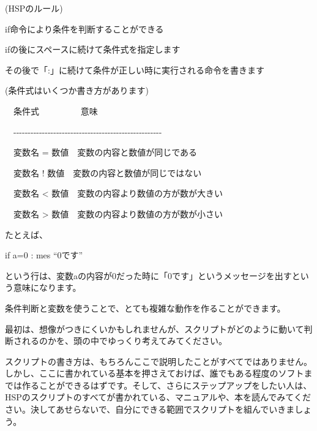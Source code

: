 \documentclass[text02.tex]{subfiles}
\begin{document}
\begin{description}
    \item (HSPのルール)
\end{description}

\begin{description}
    \item if命令により条件を判断することができる
    \item ifの後にスペースに続けて条件式を指定します
    \item その後で「:」に続けて条件が正しい時に実行される命令を書きます
\end{description}

\begin{description}
    \item (条件式はいくつか書き方があります)
\end{description}

\begin{description}
    \item \ \ 条件式 \ \ \ \ \ \ \ \ \ 意味
    \item \ \ {}-{}-{}-{}-{}-{}-{}-{}-{}-{}-{}-{}-{}-{}-{}-{}-{}-{}-{}-{}-{}-{}-{}-{}-{}-{}-{}-{}-{}-{}-{}-{}-{}-{}-{}-{}-{}-{}-{}-{}-{}-{}-{}-{}-{}-{}-{}-{}-{}-{}-{}-{}-
    \item \ \ 変数名 = 数値\ \ 変数の内容と数値が同じである
    \item \ \ 変数名 ! 数値\ \ 変数の内容と数値が同じではない
    \item \ \ 変数名 {\textless} 数値\ \ 変数の内容より数値の方が数が大きい
    \item \ \ 変数名 {\textgreater} 数値\ \ 変数の内容より数値の方が数が小さい
\end{description}

たとえば、

\begin{description}
    \item if a=0 : mes “0です”
\end{description}

という行は、変数aの内容が0だった時に「0です」というメッセージを出すという意味になります。

条件判断と変数を使うことで、とても複雑な動作を作ることができます。

最初は、想像がつきにくいかもしれませんが、スクリプトがどのように動いて判断されるのかを、頭の中でゆっくり考えてみてください。

スクリプトの書き方は、もちろんここで説明したことがすべてではありません。しかし、ここに書かれている基本を押さえておけば、誰でもある程度のソフトまでは作ることができるはずです。そして、さらにステップアップをしたい人は、HSPのスクリプトのすべてが書かれている、マニュアルや、本を読んでみてください。決してあせらないで、自分にできる範囲でスクリプトを組んでいきましょう。
\end{document}
